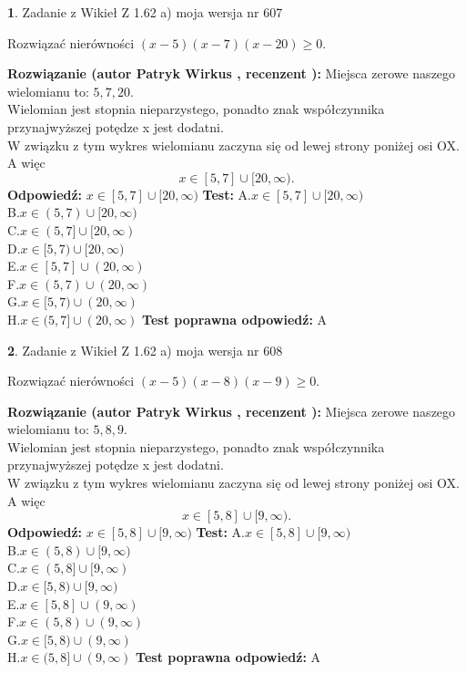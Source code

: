 \documentclass[12pt, a4paper]{article}
\theoremstyle{definition} %
\newtheorem{zad}{}
\newcommand{\zadStart}[1]{\begin{zad}#1\newline}
\newcommand{\zadStop}{\end{zad}}
\newcommand{\rozwStart}[2]{\noindent \textbf{Rozwiązanie (autor #1 , recenzent #2): }\newline}
\newcommand{\rozwStop}{\newline}
\newcommand{\odpStart}{\noindent \textbf{Odpowiedź:}\newline}
\newcommand{\odpStop}{\newline}
\newcommand{\testStart}{\noindent \textbf{Test:}\newline}
\newcommand{\testStop}{\newline}
\newcommand{\kluczStart}{\noindent \textbf{Test poprawna odpowiedź:}\newline}
\newcommand{\kluczStop}{\newline}
\begin{document}
\zadStart{Zadanie z Wikieł Z 1.62 a) moja wersja nr 607}

Rozwiązać nierówności $(x-5)(x-7)(x-20)\ge0$.
\zadStop
\rozwStart{Patryk Wirkus}{}
Miejsca zerowe naszego wielomianu to: $5, 7, 20$.\\
Wielomian jest stopnia nieparzystego, ponadto znak współczynnika przy\linebreak najwyższej potędze x jest dodatni.\\ W związku z tym wykres wielomianu zaczyna się od lewej strony poniżej osi OX. A więc $$x \in [5,7] \cup [20,\infty).$$
\rozwStop
\odpStart
$x \in [5,7] \cup [20,\infty)$
\odpStop
\testStart
A.$x \in [5,7] \cup [20,\infty)$\\
B.$x \in (5,7) \cup [20,\infty)$\\
C.$x \in (5,7] \cup [20,\infty)$\\
D.$x \in [5,7) \cup [20,\infty)$\\
E.$x \in [5,7] \cup (20,\infty)$\\
F.$x \in (5,7) \cup (20,\infty)$\\
G.$x \in [5,7) \cup (20,\infty)$\\
H.$x \in (5,7] \cup (20,\infty)$
\testStop
\kluczStart
A
\kluczStop



\zadStart{Zadanie z Wikieł Z 1.62 a) moja wersja nr 608}

Rozwiązać nierówności $(x-5)(x-8)(x-9)\ge0$.
\zadStop
\rozwStart{Patryk Wirkus}{}
Miejsca zerowe naszego wielomianu to: $5, 8, 9$.\\
Wielomian jest stopnia nieparzystego, ponadto znak współczynnika przy\linebreak najwyższej potędze x jest dodatni.\\ W związku z tym wykres wielomianu zaczyna się od lewej strony poniżej osi OX. A więc $$x \in [5,8] \cup [9,\infty).$$
\rozwStop
\odpStart
$x \in [5,8] \cup [9,\infty)$
\odpStop
\testStart
A.$x \in [5,8] \cup [9,\infty)$\\
B.$x \in (5,8) \cup [9,\infty)$\\
C.$x \in (5,8] \cup [9,\infty)$\\
D.$x \in [5,8) \cup [9,\infty)$\\
E.$x \in [5,8] \cup (9,\infty)$\\
F.$x \in (5,8) \cup (9,\infty)$\\
G.$x \in [5,8) \cup (9,\infty)$\\
H.$x \in (5,8] \cup (9,\infty)$
\testStop
\kluczStart
A
\kluczStop
\end{document}
